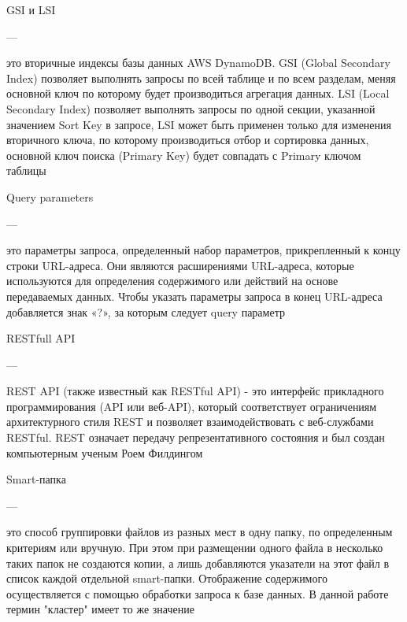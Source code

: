 \RaggedRight \noindent GSI и LSI
\begin{minipage}[t][][t]{1.7cm}
\RaggedLeft
  ---
\end{minipage}
\begin{minipage}[t][][t]{0.75\textwidth}
\RaggedRight  \justify \sloppy
это вторичные индексы базы данных AWS DynamoDB. GSI (Global Secondary Index) позволяет выполнять запросы по всей таблице и по всем разделам, меняя основной ключ по которому будет производиться агрегация данных. LSI (Local Secondary Index) позволяет выполнять запросы по одной секции, указанной значением Sort Key в запросе, LSI может быть применен только для изменения вторичного ключа, по которому производиться отбор и сортировка данных, основной ключ поиска (Primary Key) будет совпадать с Primary ключом таблицы \\
\end{minipage}



\RaggedRight \noindent \justify \sloppy Query parameters
\begin{minipage}[t][][t]{0.4cm}
\RaggedLeft
  ---
\end{minipage}
\begin{minipage}[t][][t]{0.75\textwidth}
\RaggedRight  \justify \sloppy
это параметры запроса, определенный набор параметров, прикрепленный к концу строки URL-адреса. Они являются расширениями URL-адреса, которые используются для определения содержимого или действий на основе передаваемых данных. Чтобы указать параметры запроса в конец URL-адреса добавляется знак «?», за которым следует query параметр \\
\end{minipage}



\RaggedRight \noindent \justify \sloppy RESTfull API
\begin{minipage}[t][][t]{1.3cm}
\RaggedLeft
  ---
\end{minipage}
\begin{minipage}[t][][t]{0.75\textwidth}
\RaggedRight  \justify \sloppy
REST API (также известный как RESTful API) - это интерфейс прикладного программирования (API или веб-API), который соответствует ограничениям архитектурного стиля REST и позволяет взаимодействовать с веб-службами RESTful. REST означает передачу репрезентативного состояния и был создан компьютерным ученым Роем Филдингом \\
\end{minipage}
\RaggedRight \noindent \justify \sloppy Smart-папка
\begin{minipage}[t][][t]{1.4cm}
\RaggedLeft
  ---
\end{minipage}
\begin{minipage}[t][][t]{0.75\textwidth}
\RaggedRight  \justify \sloppy
это способ группировки файлов из разных мест в одну папку, по определенным критериям или вручную. При этом при размещении одного файла в несколько таких папок не создаются копии, а лишь добавляются указатели на этот файл в список каждой отдельной smart-папки. Отображение содержимого осуществляется с помощью обработки запроса к базе данных. В данной работе термин "кластер" имеет то же значение
\end{minipage}